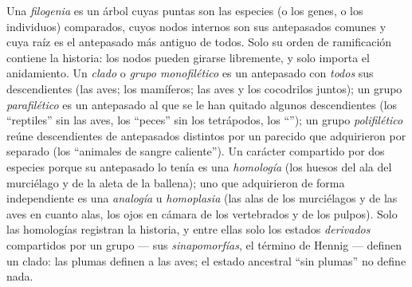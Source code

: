 \begin{definition}\label{def:b2:phylogenetic-trees:tree}
Una \emph{filogenia} es un árbol cuyas puntas son las especies (o los
genes, o los individuos) comparados, cuyos nodos internos son sus
antepasados comunes y cuya raíz es el antepasado más antiguo de todos. Solo
su orden de ramificación contiene la historia: los nodos pueden girarse
libremente, y solo importa el anidamiento. Un \emph{clado} o
\emph{grupo monofilético} es un antepasado con \emph{todos} sus
descendientes (las aves; los mamíferos; las aves y los cocodrilos juntos);
un grupo \emph{parafilético} es un antepasado al que se le han quitado
algunos descendientes (los ``reptiles'' sin las aves, los ``peces'' sin los
tetrápodos, los ``''); un grupo \emph{polifilético} reúne
descendientes de antepasados distintos por un parecido que adquirieron por
separado (los ``animales de sangre caliente''). Un carácter compartido por
dos especies porque su antepasado lo tenía es una \emph{homología} (los
huesos del ala del murciélago y de la aleta de la ballena); uno que
adquirieron de forma independiente es una \emph{analogía} u
\emph{homoplasia} (las alas de los murciélagos y de las aves en cuanto
alas, los ojos en cámara de los vertebrados y de los pulpos). Solo las
homologías registran la historia, y entre ellas solo los estados
\emph{derivados} compartidos por un grupo --- sus
\emph{sinapomorfías}, el término de Hennig --- definen un clado: las
plumas definen a las aves; el estado ancestral ``sin plumas'' no define
nada.
\end{definition}
